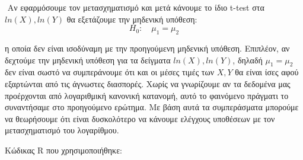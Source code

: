 \documentclass[oneside,a4paper]{article}
\newcommand {\tl}{\textlatin}
\begin{document}
\begin{enumerate}
    $ $\newline
    Αν εφαρμόσουμε τον μετασχηματισμό και μετά κάνουμε το ίδιο \tl{t-test} στα $ln(X),ln(Y)$ θα εξετάζουμε την μηδενική υπόθεση:
    $$H_0 : \quad \mu_1 =  \mu_2$$
    
    η οποία δεν είναι ισοδύναμη με την προηγούμενη μηδενική υπόθεση. Επιπλέον, αν δεχτούμε την μηδενική υπόθεση για τα δείγματα $ln(X),ln(Y)$, δηλαδή $\mu_1 = \mu_2$ δεν είναι σωστό να συμπεράνουμε ότι και οι μέσες τιμές των $X,Y$ θα είναι ίσες αφού εξαρτώνται από τις άγνωστες διασπορές. Χωρίς να γνωρίζουμε αν τα δεδομένα μας προέρχονται από λογαριθμική κανονική κατανομή, αυτό το φαινόμενο πράγματι το συναντήσαμε στο προηγούμενο ερώτημα. Με βάση αυτά τα συμπεράσματα μπορούμε να θεωρήσουμε ότι είναι δυσκολότερο να κάνουμε ελέγχους υποθέσεων με τον μετασχηματισμό του λογαρίθμου.
\end{enumerate}
\pagebreak

\noindent Κώδικας \tl{R} που χρησιμοποιήθηκε:
\end{document}
